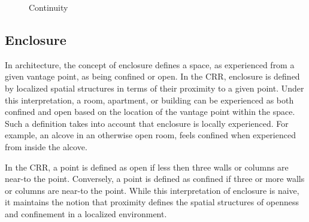 \documentclass[12pt]{ucthesis}
\begin{document}
\begin{figure}[H]
 \centering
  \hspace{30 mm}
 \caption{Continuity}
\label{continuity}
\end{figure}

\subsection{Enclosure} 
In architecture, the concept of enclosure defines a space, as experienced from a given vantage point, as being confined or open. In the CRR, enclosure is defined by localized spatial structures in terms of their proximity to a given point. Under this interpretation, a room, apartment, or building can be experienced as both confined and open based on the location of the vantage point within the space. Such a definition takes into account that enclosure is locally experienced. For example, an alcove in an otherwise open room, feels confined when experienced from inside the alcove.

In the CRR, a point is defined as open if less then three walls or columns are near-to the point. Conversely, a point is defined as confined if three or more walls or columns are near-to the point. While this interpretation of enclosure is naive, it maintains the notion that proximity defines the spatial structures of openness and confinement in a localized environment.   
\end{document}

